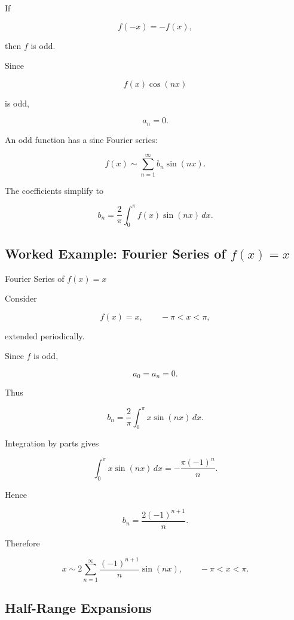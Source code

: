 If

\[
f(-x)=-f(x),
\]

then \(f\) is odd.

Since

\[
f(x)\cos(nx)
\]

is odd,

\[
\boxed{
a_n=0.
}
\]

An odd function has a sine Fourier series:

\[
\boxed{
f(x)
\sim
\sum_{n=1}^{\infty}
b_n\sin(nx).
}
\]

The coefficients simplify to

\[
\boxed{
b_n
=
\frac{2}{\pi}
\int_0^\pi
f(x)\sin(nx)\,dx.
}
\]

\subsection{Worked Example: Fourier Series of \(f(x)=x\)}
\label{subsec:worked-fourier-x}

\begin{workedexamplebox}{Fourier Series of \(f(x)=x\)}

Consider

\[
f(x)=x,
\qquad
-\pi<x<\pi,
\]

extended periodically.

Since \(f\) is odd,

\[
a_0=a_n=0.
\]

Thus

\[
b_n
=
\frac{2}{\pi}
\int_0^\pi
x\sin(nx)\,dx.
\]

Integration by parts gives

\[
\int_0^\pi
x\sin(nx)\,dx
=
-\frac{\pi(-1)^n}{n}.
\]

Hence

\[
b_n
=
\frac{2(-1)^{n+1}}{n}.
\]

Therefore

\begin{answerbox}
\[
\boxed{
x
\sim
2\sum_{n=1}^{\infty}
\frac{(-1)^{n+1}}{n}\sin(nx),
\qquad
-\pi<x<\pi.
}
\]
\end{answerbox}
\end{workedexamplebox}

\subsection{Half-Range Expansions}
\label{subsec:half-range-fourier}

